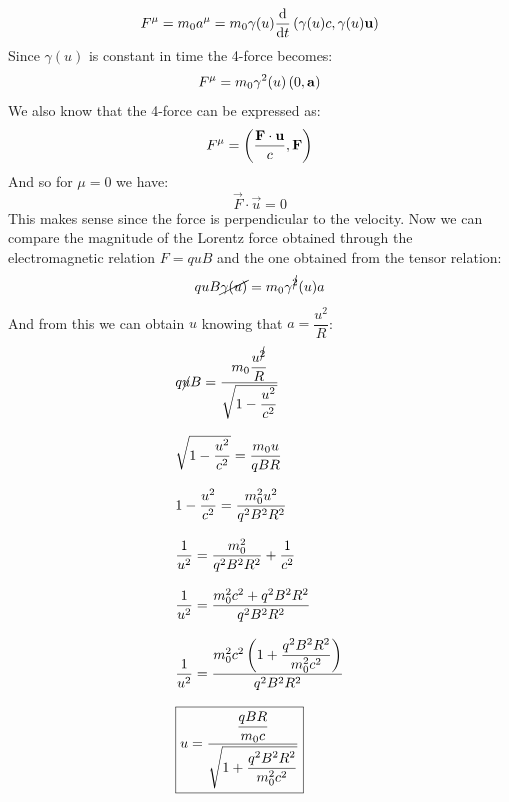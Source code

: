 \begin{equation}
  F^{\mu} = m_0a^{\mu} = m_0 \gamma(u) \dv{}{t}\brackets{\gamma(u)c, \gamma(u)\vec{u}}
\end{equation}
Since $\gamma(u)$ is constant in time the 4-force becomes:
\begin{equation}
  F^{\mu} = m_0 \gamma^2(u)\left(0, \vb{a}\right)
\end{equation}
We also know that the 4-force can be expressed as:
\begin{equation}
  F^{\mu} = \left(\dfrac{\vb{F}\cdot \vb{u}}{c}, \vb{F}\right)
\end{equation}
And so for $\mu = 0$ we have:
\begin{equation}
  \vec{F}\cdot \vec{u} = 0
\end{equation}
This makes sense since the force is perpendicular to the velocity. Now we can compare the magnitude of the Lorentz force obtained through the electromagnetic relation $F = quB$ and the one obtained from the tensor relation:
\begin{equation}
  quB\cancel{\gamma(u)} = m_0\gamma^{\cancel{2}}(u)a
\end{equation}
And from this we can obtain $u$ knowing that $a = \dfrac{u^2}{R}$:
\begin{equation}
  \begin{split}
    &q\cancel{u}B = \dfrac{m_0\dfrac{u^{\cancel{2}}}{R}}{\sqrt{1-\dfrac{u^2}{c^2}}} \\[8pt]
    &\sqrt{1-\dfrac{u^2}{c^2}} = \dfrac{m_0u}{qBR} \\[8pt]
    &1-\dfrac{u^2}{c^2} = \dfrac{m_0^2u^2}{q^2B^2R^2} \\[8pt]
    &\dfrac{1}{u^2} = \dfrac{m_0^2}{q^2B^2R^2} + \dfrac{1}{c^2} \\[8pt]
    &\dfrac{1}{u^2} = \dfrac{m_0^2c^2 + q^2B^2R^2}{q^2B^2R^2} \\[8pt]
    &\dfrac{1}{u^2} = \dfrac{m_0^2c^2\left(1 + \dfrac{q^2B^2R^2}{m_0^2c^2}\right)}{q^2B^2R^2} \\[8pt]
    &\boxed{u = \dfrac{\dfrac{qBR}{m_0c}}{\sqrt{1 + \dfrac{q^2B^2R^2}{m_0^2c^2}}}}
  \end{split}
\end{equation}
